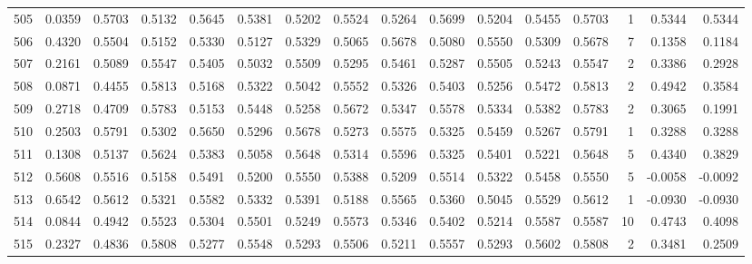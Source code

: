 \begin{tabular}{lrrrrrrrrrrrrrrr}
505 &      0.0359 &  0.5703 &  0.5132 &  0.5645 &  0.5381 &  0.5202 &  0.5524 &  0.5264 &  0.5699 &  0.5204 &   0.5455 &     0.5703 &      1 &                    0.5344 &                     0.5344 \\
506 &      0.4320 &  0.5504 &  0.5152 &  0.5330 &  0.5127 &  0.5329 &  0.5065 &  0.5678 &  0.5080 &  0.5550 &   0.5309 &     0.5678 &      7 &                    0.1358 &                     0.1184 \\
507 &      0.2161 &  0.5089 &  0.5547 &  0.5405 &  0.5032 &  0.5509 &  0.5295 &  0.5461 &  0.5287 &  0.5505 &   0.5243 &     0.5547 &      2 &                    0.3386 &                     0.2928 \\
508 &      0.0871 &  0.4455 &  0.5813 &  0.5168 &  0.5322 &  0.5042 &  0.5552 &  0.5326 &  0.5403 &  0.5256 &   0.5472 &     0.5813 &      2 &                    0.4942 &                     0.3584 \\
509 &      0.2718 &  0.4709 &  0.5783 &  0.5153 &  0.5448 &  0.5258 &  0.5672 &  0.5347 &  0.5578 &  0.5334 &   0.5382 &     0.5783 &      2 &                    0.3065 &                     0.1991 \\
510 &      0.2503 &  0.5791 &  0.5302 &  0.5650 &  0.5296 &  0.5678 &  0.5273 &  0.5575 &  0.5325 &  0.5459 &   0.5267 &     0.5791 &      1 &                    0.3288 &                     0.3288 \\
511 &      0.1308 &  0.5137 &  0.5624 &  0.5383 &  0.5058 &  0.5648 &  0.5314 &  0.5596 &  0.5325 &  0.5401 &   0.5221 &     0.5648 &      5 &                    0.4340 &                     0.3829 \\
512 &      0.5608 &  0.5516 &  0.5158 &  0.5491 &  0.5200 &  0.5550 &  0.5388 &  0.5209 &  0.5514 &  0.5322 &   0.5458 &     0.5550 &      5 &                   -0.0058 &                    -0.0092 \\
513 &      0.6542 &  0.5612 &  0.5321 &  0.5582 &  0.5332 &  0.5391 &  0.5188 &  0.5565 &  0.5360 &  0.5045 &   0.5529 &     0.5612 &      1 &                   -0.0930 &                    -0.0930 \\
514 &      0.0844 &  0.4942 &  0.5523 &  0.5304 &  0.5501 &  0.5249 &  0.5573 &  0.5346 &  0.5402 &  0.5214 &   0.5587 &     0.5587 &     10 &                    0.4743 &                     0.4098 \\
515 &      0.2327 &  0.4836 &  0.5808 &  0.5277 &  0.5548 &  0.5293 &  0.5506 &  0.5211 &  0.5557 &  0.5293 &   0.5602 &     0.5808 &      2 &                    0.3481 &                     0.2509 \\

\end{tabular}
